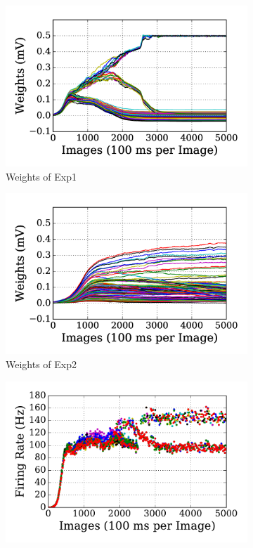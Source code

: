 \begin{figure}
	\centering
	\begin{subfigure}[t]{0.48\textwidth}
		\includegraphics[width=\textwidth]{pics_sdlm/11_exp_SRBM_Orig_long/exp1_weights_s.png}
		\caption{Weights of Exp1}
	\end{subfigure}
	\begin{subfigure}[t]{0.48\textwidth}
		\includegraphics[width=\textwidth]{pics_sdlm/11_exp_SRBM_Orig_long/exp2_weights_s.png}
		\caption{Weights of Exp2}
	\end{subfigure}
	\begin{subfigure}[t]{0.48\textwidth}
		\includegraphics[width=\textwidth]{pics_sdlm/11_exp_SRBM_Orig_long/exp1_recon_s.pdf}

\end{subfigure}
\end{figure}
